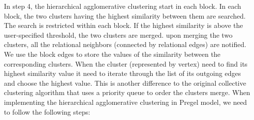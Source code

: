 In step 4, the hierarchical agglomerative clustering start in each block. In each block, the two clusters having the highest similarity between them are searched. The search is restricted within each block. If the highest similarity is above the user-specified threshold, the two clusters are merged. upon merging the two clusters, all the relational neighbors (connected by relational edges) are notified. We use the block edges to store the values of the similarity between the corresponding clusters. When the cluster (represented by  vertex) need to find its highest similarity value it need to iterate through the list of its outgoing edges and choose the highest value. This is another difference to the original collective clustering algorithm that uses a priority queue to order the clusters merge.
When implementing the hierarchical agglomerative clustering in Pregel model, we need to follow the following steps:
